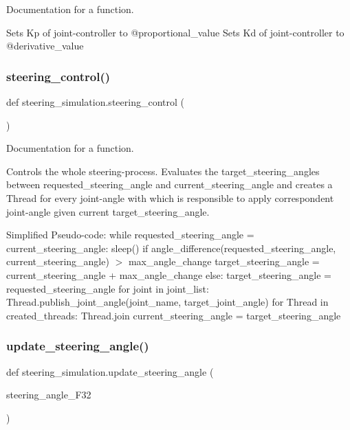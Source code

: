 Documentation for a function. 

Sets Kp of joint-\/controller to @proportional\+\_\+value Sets Kd of joint-\/controller to @derivative\+\_\+value \mbox{\label{namespacesteering__simulation_a7e6cf517d5eedfae29bc0b05bada6a3e}} 
\subsubsection{\texorpdfstring{steering\_control()}{steering\_control()}}
{\footnotesize\ttfamily def steering\+\_\+simulation.\+steering\+\_\+control (\begin{DoxyParamCaption}{ }\end{DoxyParamCaption})}



Documentation for a function. 

Controls the whole steering-\/process. Evaluates the target\+\_\+steering\+\_\+angles between requested\+\_\+steering\+\_\+angle and current\+\_\+steering\+\_\+angle and creates a Thread for every joint-\/angle with which is responsible to apply correspondent joint-\/angle given current target\+\_\+steering\+\_\+angle.

Simplified Pseudo-\/code\+: while requested\+\_\+steering\+\_\+angle = current\+\_\+steering\+\_\+angle\+: sleep() if angle\+\_\+difference(requested\+\_\+steering\+\_\+angle, current\+\_\+steering\+\_\+angle) $>$ max\+\_\+angle\+\_\+change target\+\_\+steering\+\_\+angle = current\+\_\+steering\+\_\+angle + max\+\_\+angle\+\_\+change else\+: target\+\_\+steering\+\_\+angle = requested\+\_\+steering\+\_\+angle for joint in joint\+\_\+list\+: Thread.\+publish\+\_\+joint\+\_\+angle(joint\+\_\+name, target\+\_\+joint\+\_\+angle) for Thread in created\+\_\+threads\+: Thread.\+join current\+\_\+steering\+\_\+angle = target\+\_\+steering\+\_\+angle \mbox{\label{namespacesteering__simulation_ade71f08294031e29a94a9be5cc1f0961}} 
\subsubsection{\texorpdfstring{update\_steering\_angle()}{update\_steering\_angle()}}
{\footnotesize\ttfamily def steering\+\_\+simulation.\+update\+\_\+steering\+\_\+angle (\begin{DoxyParamCaption}\item[{}]{steering\+\_\+angle\+\_\+\+F32 }\end{DoxyParamCaption})}



